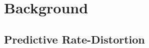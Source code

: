 \documentclass[11pt,letterpaper]{article}
\begin{document}
%
%
%
%
%
%
%
%
%



\section{Background}

\subsection{Predictive Rate-Distortion}
\end{document}
